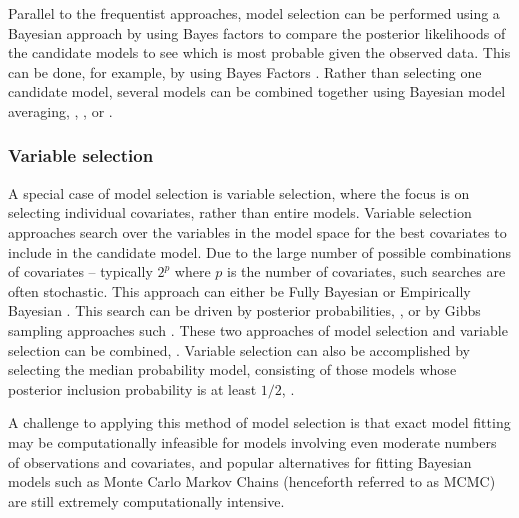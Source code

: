 Parallel to the frequentist approaches, model selection can be performed using a
Bayesian approach by using Bayes factors to compare the posterior likelihoods of
the candidate models to see which is most probable given the observed data. This
can be done, for example, by using Bayes Factors \citep{Kass1993}. Rather than
selecting one candidate model, several models can be combined together using
Bayesian model  averaging, \citep{Hoeting1999}, \citep{Raftery1997},
\citep{Fernandez2001} or \citep{Papaspiliopoulos2016}.

\subsubsection{Variable selection}

A special case of model selection is variable selection, where the focus is on
selecting individual covariates, rather than entire models. Variable selection
approaches search over the variables in the model space for the best covariates
to include in the candidate model. Due to the large number of possible
combinations of covariates -- typically $2^p$ where $p$ is the number of
covariates, such searches are often stochastic. This approach can either be
Fully Bayesian or Empirically Bayesian \citep{Cui2008}.  This search can be
driven by posterior probabilities,  \cite{Casella2006}, or by Gibbs sampling
approaches such  \cite{George1993}. These two approaches of model selection and
variable selection can be combined,  \cite{Geweke1996}. Variable selection can
also be accomplished by selecting the median probability model, consisting of
those models whose posterior inclusion probability is at least $1/2$,
\cite{Barbieri2004}.

A challenge to applying this method of model selection is that exact model
fitting may be computationally infeasible for models involving even moderate
numbers of observations and covariates, and popular alternatives for fitting
Bayesian models such as Monte Carlo Markov Chains (henceforth referred to as
MCMC) are still extremely computationally intensive.




